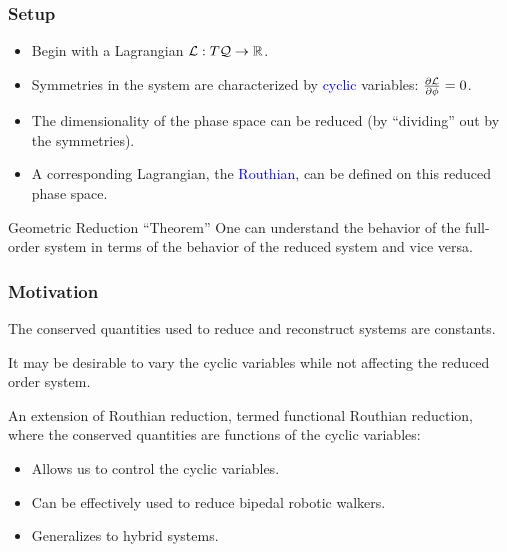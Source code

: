 \begin{frame}
  \frametitle{Setup}
  \begin{description}[D]
  \item[ Geometric reduction\footnote{For more on geometric reduction, see [Marsden, Springer-Verlag 1994]}:] \hspace{5cm}

    \begin{itemize}
    \item Begin with a Lagrangian $\mathcal{L} : T\mathcal{Q} \to \mathbb{R}$.
    \item Symmetries in the system are characterized by \textcolor{blue}{cyclic}
      variables: $\frac{\partial \mathcal{L}}{\partial \phi} = 0$.
    \item The dimensionality of the phase space can be reduced (by ``dividing'' out by the symmetries).
    \item A corresponding Lagrangian, the \textcolor{blue}{Routhian}, can be defined on this reduced phase space.
    \end{itemize}
  \end{description}

  \begin{block}{Geometric Reduction ``Theorem''}
    One can understand the behavior of the full-order system in terms of
    the behavior of the reduced system and vice versa.
  \end{block}
\end{frame}

\begin{frame}
  \frametitle{Motivation}
  \begin{description}[D]
  \item[ Classical Reduction:]  The conserved quantities used to reduce and reconstruct systems are constants.
  \item[ Yet:]  It may be desirable to \alert{vary} the cyclic variables while not affecting the reduced order system.
  \item[ Motivates:]  An extension of Routhian reduction, termed \alert{functional Routhian reduction}, where the conserved quantities are functions of the cyclic variables:
    \begin{itemize}
    \item Allows us to control the cyclic variables.
    \item Can be effectively used to reduce bipedal robotic walkers.
    \item Generalizes to hybrid systems.
    \end{itemize}
  \end{description}
\end{frame}

